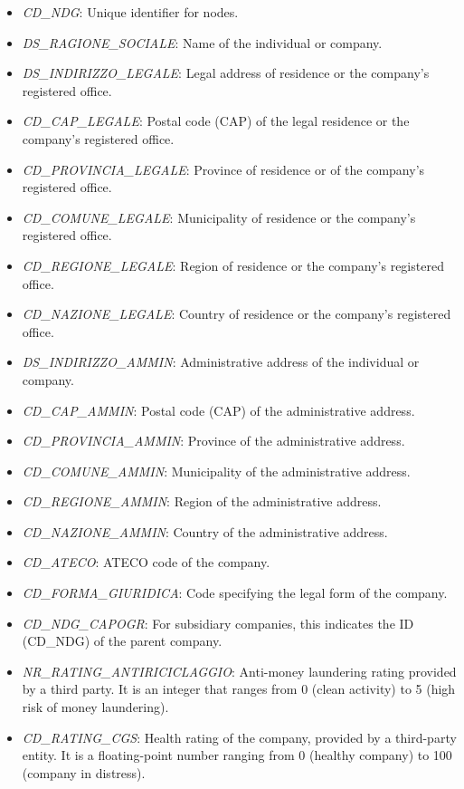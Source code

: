 \begin{itemize}
    \item \emph{CD\_NDG}: Unique identifier for nodes.
    \item \emph{DS\_RAGIONE\_SOCIALE}: Name of the individual or company.
    \item \emph{DS\_INDIRIZZO\_LEGALE}: Legal address of residence or the company’s registered office.
    \item \emph{CD\_CAP\_LEGALE}: Postal code (CAP) of the legal residence or the company’s registered office.
    \item \emph{CD\_PROVINCIA\_LEGALE}: Province of residence or of the company’s registered office.
    \item \emph{CD\_COMUNE\_LEGALE}: Municipality of residence or the company’s registered office.
    \item \emph{CD\_REGIONE\_LEGALE}: Region of residence or the company’s registered office.
    \item \emph{CD\_NAZIONE\_LEGALE}: Country of residence or the company’s registered office.
    \item \emph{DS\_INDIRIZZO\_AMMIN}: Administrative address of the individual or company.
    \item \emph{CD\_CAP\_AMMIN}: Postal code (CAP) of the administrative address.
    \item \emph{CD\_PROVINCIA\_AMMIN}: Province of the administrative address.
    \item \emph{CD\_COMUNE\_AMMIN}: Municipality of the administrative address.
    \item \emph{CD\_REGIONE\_AMMIN}: Region of the administrative address.
    \item \emph{CD\_NAZIONE\_AMMIN}: Country of the administrative address.
    \item \emph{CD\_ATECO}: ATECO code of the company.
    \item \emph{CD\_FORMA\_GIURIDICA}: Code specifying the legal form of the company.
    \item \emph{CD\_NDG\_CAPOGR}: For subsidiary companies, this indicates the ID (CD\_NDG) of the parent company.
    \item \emph{NR\_RATING\_ANTIRICICLAGGIO}: Anti-money laundering rating provided by a third party. It is an integer that ranges from 0 (clean activity) to 5 (high risk of money laundering).
    \item \emph{CD\_RATING\_CGS}: Health rating of the company, provided by a third-party entity. It is a floating-point number ranging from 0 (healthy company) to 100 (company in distress).
\end{itemize}

